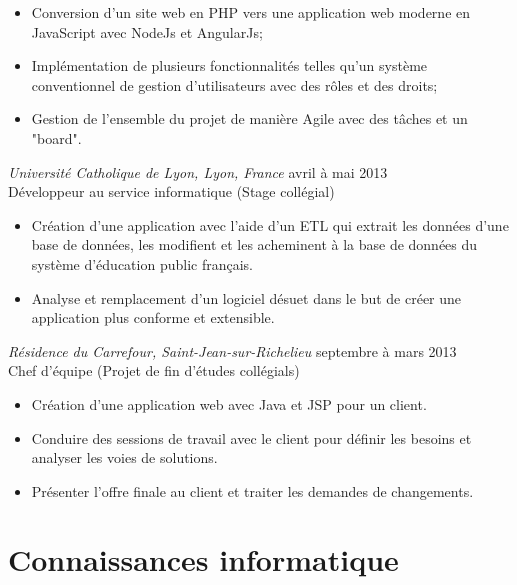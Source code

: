 \documentclass{res}
\begin{document}
\begin{resume}
\begin{itemize} \itemsep -2pt
	\item Conversion d’un site web en PHP vers une application web moderne en JavaScript avec NodeJs et AngularJs;
	\item Implémentation de plusieurs fonctionnalités telles qu’un système conventionnel de gestion d’utilisateurs avec des rôles et des droits;
	\item Gestion de l’ensemble du projet de manière Agile avec des tâches et un "board".
\end{itemize}


{\sl Université Catholique de Lyon, Lyon, France}
\hfill avril à mai 2013 \\
Développeur au service informatique \hfill (Stage collégial)

\begin{itemize} \itemsep -2pt
	\item Création d’une application avec l’aide d’un ETL qui extrait les données d’une base de données, les modifient et les acheminent à la base de données du système d’éducation public français.
	\item Analyse et remplacement d’un logiciel désuet dans le but de créer une application plus conforme et extensible.
\end{itemize}


{\sl Résidence du Carrefour, Saint-Jean-sur-Richelieu}
\hfill septembre à mars 2013 \\
Chef d'équipe \hfill (Projet de fin d'études collégials)

\begin{itemize} \itemsep -2pt
	\item Création d’une application web avec Java et JSP pour un client.
	\item Conduire des sessions de travail avec le client pour définir les besoins et analyser les voies de solutions.
	\item Présenter l’offre finale au client et traiter les demandes de changements.
\end{itemize}

\vspace{0.1in}


\section{Connaissances informatique}
\vspace{12pt}


\end{resume}
\end{document}
